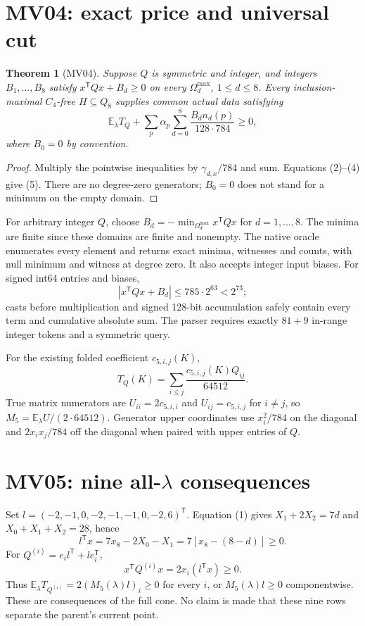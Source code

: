 \documentclass[11pt]{article}
\newtheorem{theorem}{Theorem}
\newcommand{\Om}{\Omega^{\mathrm{max}}}
\begin{document}
\section{MV04: exact price and universal cut}
\begin{theorem}[MV04]
Suppose $Q$ is symmetric and integer, and integers $B_1,\ldots,B_8$
satisfy $x^{\mathsf T}Qx+B_d\ge0$ on every $\Om_d$, $1\le d\le8$.
Every inclusion-maximal $C_4$-free $H\subseteq Q_8$ supplies common
actual data satisfying
\[
 \mathbb E_\lambda T_Q+
 \sum_p\alpha_p\sum_{d=0}^8\frac{B_dn_d(p)}{128\cdot784}\ge0,     \tag{5}
\]
where $B_0=0$ by convention.
\end{theorem}
\begin{proof}
Multiply the pointwise inequalities by $\gamma_{d,x}/784$ and sum.
Equations (2)--(4) give (5). There are no degree-zero generators;
$B_0=0$ does not stand for a minimum on the empty domain.
\end{proof}
For arbitrary integer $Q$, choose $B_d=-\min_{\Om_d}x^{\mathsf T}Qx$
for $d=1,\ldots,8$. The minima are finite since these domains are
finite and nonempty. The native oracle enumerates every element and
returns exact minima, witnesses and counts, with null minimum and
witness at degree zero. It also accepts integer input biases.
For signed int64 entries and biases,
\[
 |x^{\mathsf T}Qx+B_d|\le785\cdot2^{63}<2^{73};
\]
casts before multiplication and signed 128-bit accumulation safely
contain every term and cumulative absolute sum. The parser requires
exactly $81+9$ in-range integer tokens and a symmetric query.

For the existing folded coefficient $c_{5,i,j}(K)$,
\[
 T_Q(K)=\sum_{i\le j}\frac{c_{5,i,j}(K)Q_{ij}}{64512}.
\]
True matrix numerators are $U_{ii}=2c_{5,i,i}$ and $U_{ij}=c_{5,i,j}$
for $i\ne j$, so $M_5=\mathbb E_\lambda U/(2\cdot64512)$.
Generator upper coordinates use $x_i^2/784$ on the diagonal and
$2x_ix_j/784$ off the diagonal when paired with upper entries of $Q$.

\section{MV05: nine all-$\lambda$ consequences}
Set $l=(-2,-1,0,-2,-1,-1,0,-2,6)^{\mathsf T}$.
Equation (1) gives $X_1+2X_2=7d$ and $X_0+X_1+X_2=28$, hence
\[
 l^{\mathsf T}x=7x_8-2X_0-X_1=7[x_8-(8-d)]\ge0.
\]
For $Q^{(i)}=e_i l^{\mathsf T}+l e_i^{\mathsf T}$,
\[
 x^{\mathsf T}Q^{(i)}x=2x_i(l^{\mathsf T}x)\ge0.
\]
Thus $\mathbb E_\lambda T_{Q^{(i)}}=2(M_5(\lambda)l)_i\ge0$ for every
$i$, or $M_5(\lambda)l\ge0$ componentwise. These are consequences of
the full cone. No claim is made that these nine rows separate the
parent's current point.
\end{document}
